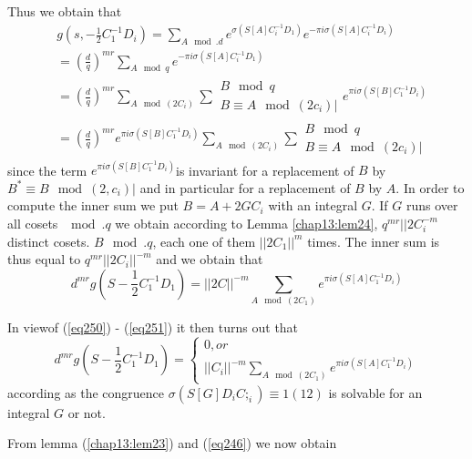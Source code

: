 Thus we obtain that 
\begin{align*}
& g (s, - \frac{1}{2}C_1^{-1} D_i) = \sum_{ A \mod . d} e^{ \sigma
    (S[A]C_i ^{-1}D_1)} e^{ -\pi i \sigma (S [A]C_i^{-1}D_i)}\\ 
& = (\frac{d}{q})^{m r } \sum_{ A \mod q} e^{ - \pi i \sigma (S [A]C_i
    ^{-1} D_1)}\\ 
& = (\frac{d}{q})^{ mr } \sum_{ A \mod (2 C_i)} \sum{\substack{ B \mod
      q \\ B \equiv A \mod (2c_i)|}} e^{ \pi i \sigma
    (S[B]C_1^{-1}D_i)}\\ 
& = (\frac{d}{q})^{ mr } e^{ \pi i \sigma (S[B]C_1^{-1}D_i)}\sum_{ A
    \mod (2 C_i)} \sum{\substack{ B \mod q \\ B \equiv A \mod
      (2c_i)|}} 
\end{align*}
since the term $e^{ \pi i \sigma (S[B]C_1^{-1}D_i)}$is
invariant for a replacement of $B$ by $B^* \equiv B \mod (2 , c_i)|$
and in particular for a replacement of $B$ by $A$. In order to compute
the inner sum we put $B = A + 2 G C_i$ with an integral $G$. If $G$
runs over all cosets $\mod . q$ we obtain according to Lemma
\ref{chap13:lem24}, $q^{
  m r }|| 2 C_i ^{-m}$ distinct cosets. $B \mod . q$, each one of them
$|| 2 C_1||^m $ times. The inner sum is thus equal to $q^{ m r } || 2
C_i||^{-m}$ and we obtain that  
$$ 
d^{ m r } g (S -\frac{1}{2} C_1^{-1} D_1) = || 2C ||^{-m} \sum_{ A
  \mod (2 C_1)} e^{ \pi i \sigma (S[A]C_1^{-1}D_i)} 
$$

In view\pageoriginale of (\ref{eq250}) - (\ref{eq251}) it then turns
out that  
\begin{equation*}
d^{ m r } g (S -\frac{1}{2} C_1^{-1} D_1) =
\begin{cases}
0, or \\
 || C_i ||^{-m} \sum_{ A \mod (2 C_1)} e^{ \pi i \sigma
   (S[A]C_1^{-1}D_i)} \tag{252}\label{eq252}   
\end{cases}
\end{equation*}
according as the congruence $\sigma (S [G] D_i C;_i) \equiv 1 (12)$ is
solvable for an integral $G$ or not.  


From lemma (\ref{chap13:lem23}) and (\ref{eq246}) we now obtain 


